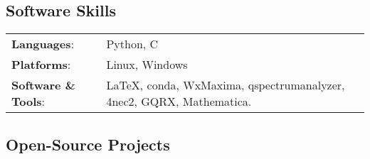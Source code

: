 \vspace*{-0.25cm}
\subsection{Software Skills}
    \begin{tabular}{P{0.25\textwidth} P{0.75\textwidth}}
        \textbf{Languages}: & Python, C \\
        \textbf{Platforms}: & Linux, Windows \\
        \textbf{Software \& Tools}: & \LaTeX, conda, WxMaxima, qspectrumanalyzer, 4nec2, GQRX, Mathematica. \\
    \end{tabular}
    \vspace*{-0.25cm}
\subsection{Open-Source Projects}
